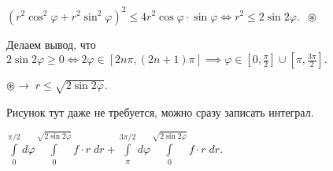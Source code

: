 \documentclass[a4paper, fleqn]{article}
\begin{document}
    $(r^2\cos^2\varphi + r^2\sin^2\varphi)^2 \leq 4 r^2 \cos \varphi \cdot \sin \varphi \iff r^2 \leq 2\sin 2\varphi. \; \; \circledast$
    
    Делаем вывод, что $2 \sin 2 \varphi \geq 0 \iff 2 \varphi \in [2n \pi, (2n + 1)\pi] \implies \varphi \in \left[0, \frac{\pi}{2}\right] \cup \left[\pi, \frac{3\pi}{2} \right].$
    
    $\circledast \to \; r \leq \sqrt{2 \sin 2 \varphi}.$ 
    
    Рисунок тут даже не требуется, можно сразу записать интеграл.
    
    $\displaystyle\int\limits_{0}^{\pi/2} d \varphi \int\limits_{0}^{\sqrt{2 \sin 2 \varphi}} f \cdot r \; d r + \int\limits_{\pi}^{3\pi/2} d \varphi \int\limits_{0}^{\sqrt{2 \sin 2 \varphi}} f \cdot r \; d r. $ \newpage
    
\end{document}
